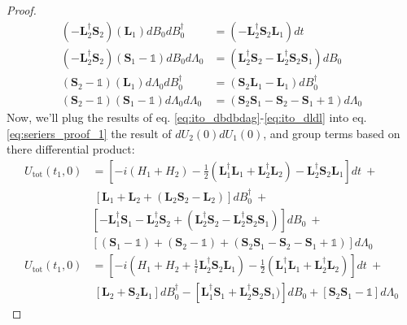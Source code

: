 \documentclass[a4paper]{article}
\theoremstyle{definition}
\begin{document}
\begin{enumerate}[label=(\roman*)]
\begin{proof}
\begin{align}
    (-\textbf{L}_2^\dagger \textbf{S}_2)(\textbf{L}_1) dB_0dB_0^\dagger & = (-\textbf{L}_2^\dagger \textbf{S}_2\textbf{L}_1) dt \label{eq:ito_dbdbdag} \\
    (-\textbf{L}_2^\dagger \textbf{S}_2)(\textbf{S}_1-\textbf{$\mathbb{1}$}) dB_0d\Lambda_0 & = (\textbf{L}_2^\dagger \textbf{S}_2-\textbf{L}_2^\dagger \textbf{S}_2\textbf{S}_1) dB_0 \label{eq:ito_dbdl} \\
    (\textbf{S}_2-\textbf{$\mathbb{1}$})(\textbf{L}_1)d\Lambda_0 dB_0^\dagger  & = (\textbf{S}_2\textbf{L}_1-\textbf{L}_1) dB^\dagger_0 \label{ito_dbdagdl} \\
    (\textbf{S}_2-\textbf{$\mathbb{1}$})(\textbf{S}_1-\textbf{$\mathbb{1}$})d\Lambda_0d\Lambda_0 & = (\textbf{S}_2\textbf{S}_1 - \textbf{S}_2 - \textbf{S}_1 + \textbf{$\mathbb{1}$}) d\Lambda_0 \label{eq:ito_dldl}
\end{align}
Now, we'll plug the results of eq. \ref{eq:ito_dbdbdag}-\ref{eq:ito_dldl} into eq. \ref{eq:seriers_proof_1} the result of $dU_2(0)dU_1(0)$, and group terms based on there differential product:
\begin{align}
    U_{\text{tot}}(t_1,0) & = [-i(H_1+H_2) - \frac{1}{2}(\textbf{L}_1^\dagger \textbf{L}_1 + \textbf{L}_2^\dagger \textbf{L}_2) - \textbf{L}_2^\dagger \textbf{S}_2\textbf{L}_1] dt \ +  \nonumber \\
    & \ [\textbf{L}_1 + \textbf{L}_2 + (\textbf{L}_2\textbf{S}_2-\textbf{L}_2)]dB_0^\dagger \ + \nonumber \\
    & [-\textbf{L}_1^\dagger \textbf{S}_1 - \textbf{L}_2^\dagger \textbf{S}_2 + (\textbf{L}_2^\dagger \textbf{S}_2-\textbf{L}_2^\dagger \textbf{S}_2\textbf{S}_1)] dB_0 \ + \nonumber \\
    & [(\textbf{S}_1-\mathbb{1}) + (\textbf{S}_2-\mathbb{1}) + (\textbf{S}_2\textbf{S}_1 - \textbf{S}_2 - \textbf{S}_1 + \mathbb{1}) ] d\Lambda_0 \nonumber \\
    U_{\text{tot}}(t_1,0) & = [-i(H_1+H_2 + \frac{1}{i}\textbf{L}_2^\dagger \textbf{S}_2\textbf{L}_1) - \frac{1}{2}(\textbf{L}_1^\dagger \textbf{L}_1 + \textbf{L}_2^\dagger \textbf{L}_2)] dt \ +  \nonumber \\
    & \ [\textbf{L}_2 + \textbf{S}_2\textbf{L}_1] dB_0^\dagger - [\textbf{L}_1^\dagger \textbf{S}_1 + \textbf{L}_2^\dagger \textbf{S}_2\textbf{S}_1)] dB_0 +  [\textbf{S}_2\textbf{S}_1  - \mathbb{1} ] d\Lambda_0  
\end{align}

\end{proof}
\end{enumerate}
\end{document}

